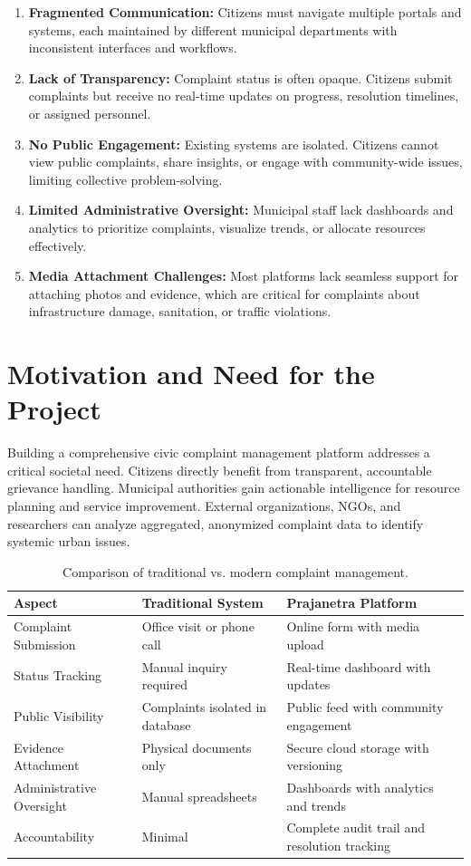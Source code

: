 \documentclass[12pt,a4paper]{report}
\begin{document}
\begin{enumerate}
    \item \textbf{Fragmented Communication:} Citizens must navigate multiple portals and systems, each maintained by different municipal departments with inconsistent interfaces and workflows.
    \item \textbf{Lack of Transparency:} Complaint status is often opaque. Citizens submit complaints but receive no real-time updates on progress, resolution timelines, or assigned personnel.
    \item \textbf{No Public Engagement:} Existing systems are isolated. Citizens cannot view public complaints, share insights, or engage with community-wide issues, limiting collective problem-solving.
    \item \textbf{Limited Administrative Oversight:} Municipal staff lack dashboards and analytics to prioritize complaints, visualize trends, or allocate resources effectively.
    \item \textbf{Media Attachment Challenges:} Most platforms lack seamless support for attaching photos and evidence, which are critical for complaints about infrastructure damage, sanitation, or traffic violations.
\end{enumerate}

\section{Motivation and Need for the Project}
Building a comprehensive civic complaint management platform addresses a critical societal need. Citizens directly benefit from transparent, accountable grievance handling. Municipal authorities gain actionable intelligence for resource planning and service improvement. External organizations, NGOs, and researchers can analyze aggregated, anonymized complaint data to identify systemic urban issues.

\begin{table}[H]
\centering
\caption{Comparison of traditional vs. modern complaint management.}
\label{tab:why_needed}
\small
\begin{tabular}{p{4cm} p{5cm} p{5cm}}
\toprule
\textbf{Aspect} & \textbf{Traditional System} & \textbf{Prajanetra Platform} \\
\midrule
Complaint Submission & Office visit or phone call & Online form with media upload \\
Status Tracking & Manual inquiry required & Real-time dashboard with updates \\
Public Visibility & Complaints isolated in database & Public feed with community engagement \\
Evidence Attachment & Physical documents only & Secure cloud storage with versioning \\
Administrative Oversight & Manual spreadsheets & Dashboards with analytics and trends \\
Accountability & Minimal & Complete audit trail and resolution tracking \\
\bottomrule
\end{tabular}
\end{table}
\end{document}
